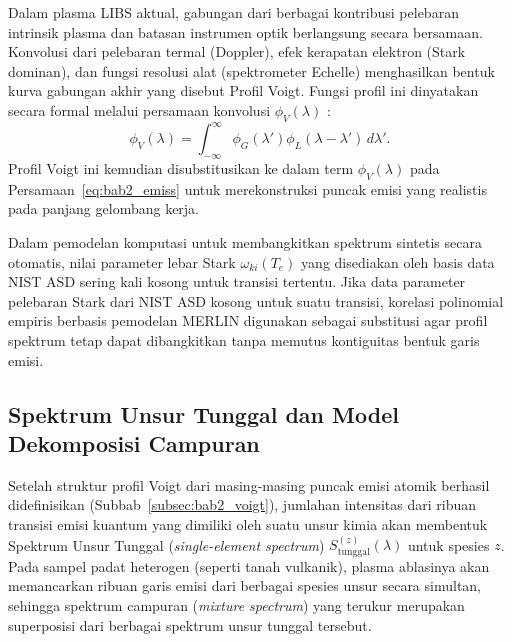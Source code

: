Dalam plasma LIBS aktual, gabungan dari berbagai kontribusi pelebaran intrinsik plasma dan batasan instrumen optik berlangsung secara bersamaan. Konvolusi dari pelebaran termal (Doppler), efek kerapatan elektron (Stark dominan), dan fungsi resolusi alat (spektrometer Echelle) menghasilkan bentuk kurva gabungan akhir yang disebut Profil Voigt. Fungsi profil ini dinyatakan secara formal melalui persamaan konvolusi $\phi_V(\lambda)$ \citep{griem_spectral_1974}:
\begin{equation} \label{eq:bab2_voigt}
\phi_V(\lambda) = \int_{-\infty}^{\infty} \phi_G(\lambda') \phi_L(\lambda - \lambda') \, d\lambda'.
\end{equation}
Profil Voigt ini kemudian disubstitusikan ke dalam term $\phi_V(\lambda)$ pada Persamaan~\ref{eq:bab2_emiss} untuk merekonstruksi puncak emisi yang realistis pada panjang gelombang kerja.

Dalam pemodelan komputasi untuk membangkitkan spektrum sintetis secara otomatis, nilai parameter lebar Stark $\omega_{ki}(T_e)$ yang disediakan oleh basis data NIST ASD sering kali kosong untuk transisi tertentu. Jika data parameter pelebaran Stark dari NIST ASD kosong untuk suatu transisi, korelasi polinomial empiris berbasis pemodelan MERLIN \citep{favre_merlin_2025} digunakan sebagai substitusi agar profil spektrum tetap dapat dibangkitkan tanpa memutus kontiguitas bentuk garis emisi.

\subsection{Spektrum Unsur Tunggal dan Model Dekomposisi Campuran} \label{subsec:bab2_unsur_tunggal_campuran}

Setelah struktur profil Voigt dari masing-masing puncak emisi atomik berhasil didefinisikan (Subbab~\ref{subsec:bab2_voigt}), jumlahan intensitas dari ribuan transisi emisi kuantum yang dimiliki oleh suatu unsur kimia akan membentuk Spektrum Unsur Tunggal (\textit{single-element spectrum}) $S_{\mathrm{tunggal}}^{(z)}(\lambda)$ untuk spesies $z$. Pada sampel padat heterogen (seperti tanah vulkanik), plasma ablasinya akan memancarkan ribuan garis emisi dari berbagai spesies unsur secara simultan, sehingga spektrum campuran (\textit{mixture spectrum}) yang terukur merupakan superposisi dari berbagai spektrum unsur tunggal tersebut.

